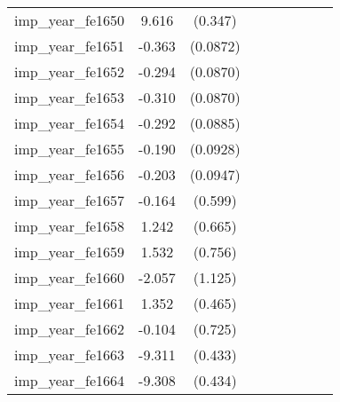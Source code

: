 {\begin{tabular}{l*{4}{cc}}
imp\_year\_fe1650&    9.616\sym{***}&  (0.347)&                  &         &                  &         &                  &         \\
imp\_year\_fe1651&   -0.363\sym{***}& (0.0872)&                  &         &                  &         &                  &         \\
imp\_year\_fe1652&   -0.294\sym{***}& (0.0870)&                  &         &                  &         &                  &         \\
imp\_year\_fe1653&   -0.310\sym{***}& (0.0870)&                  &         &                  &         &                  &         \\
imp\_year\_fe1654&   -0.292\sym{***}& (0.0885)&                  &         &                  &         &                  &         \\
imp\_year\_fe1655&   -0.190\sym{*}  & (0.0928)&                  &         &                  &         &                  &         \\
imp\_year\_fe1656&   -0.203\sym{*}  & (0.0947)&                  &         &                  &         &                  &         \\
imp\_year\_fe1657&   -0.164         &  (0.599)&                  &         &                  &         &                  &         \\
imp\_year\_fe1658&    1.242         &  (0.665)&                  &         &                  &         &                  &         \\
imp\_year\_fe1659&    1.532\sym{*}  &  (0.756)&                  &         &                  &         &                  &         \\
imp\_year\_fe1660&   -2.057         &  (1.125)&                  &         &                  &         &                  &         \\
imp\_year\_fe1661&    1.352\sym{**} &  (0.465)&                  &         &                  &         &                  &         \\
imp\_year\_fe1662&   -0.104         &  (0.725)&                  &         &                  &         &                  &         \\
imp\_year\_fe1663&   -9.311\sym{***}&  (0.433)&                  &         &                  &         &                  &         \\
imp\_year\_fe1664&   -9.308\sym{***}&  (0.434)&                  &         &                  &         &                  &         \\

\end{tabular}}
